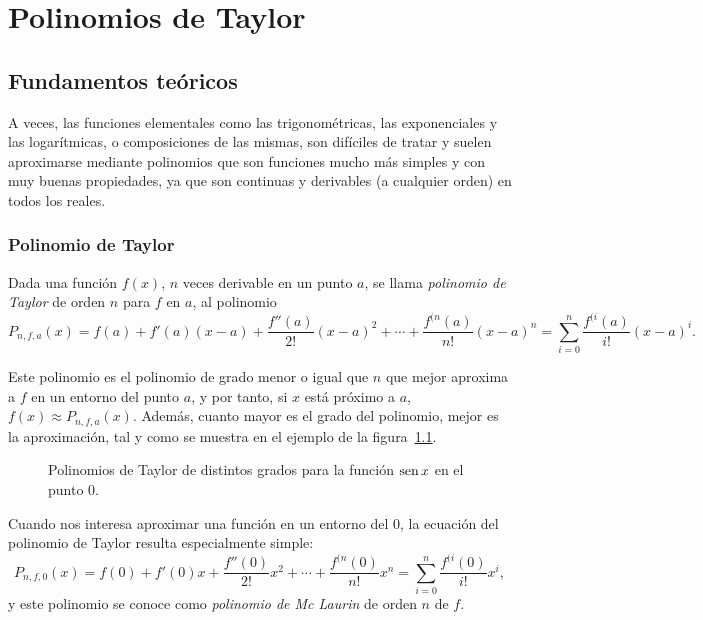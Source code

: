 
\chapter{Polinomios de Taylor}

\section{Fundamentos teóricos}

A veces, las funciones elementales como las trigonométricas, las exponenciales y las logarítmicas, o composiciones de las mismas, son difíciles de tratar y suelen aproximarse mediante polinomios que son funciones mucho más simples y con muy buenas propiedades, ya que son continuas y derivables (a cualquier orden) en todos los reales.

\subsection{Polinomio de Taylor}
Dada una función $f(x)$, $n$ veces derivable en un punto $a$, se llama \emph{polinomio de Taylor} de orden $n$ para $f$ en $a$, al polinomio
\[
P_{n,f,a}(x)=f(a)+f'(a)(x-a)+\frac{f''(a)}{2!}(x-a)^2+\cdots+\frac{f^{(n}(a)}{n!}(x-a)^n= \sum_{i=0}^{n}\frac{f^{(i}(a)}{i!}(x-a)^i.
\]

Este polinomio es el polinomio de grado menor o igual que $n$ que mejor aproxima a $f$ en un entorno del punto $a$, y por tanto, si $x$ está próximo a $a$, $f(x)\approx P_{n,f,a}(x)$. Además, cuanto mayor es el grado del polinomio, mejor es la aproximación, tal y como se muestra en el ejemplo de la figura~\ref{g:polinomios}.
\begin{figure}[h!]
\begin{center}
\scalebox{1}{}
\caption{Polinomios de Taylor de distintos grados para la función $\mathop{\rm sen}\nolimits x$ en el punto 0.}
\label{g:polinomios}
\end{center}
\end{figure}

Cuando nos interesa aproximar una función en un entorno del 0, la ecuación del polinomio de Taylor resulta especialmente simple:
\[
P_{n,f,0}(x)=f(0)+f'(0)x+\frac{f''(0)}{2!}x^2+\cdots+\frac{f^{(n}(0)}{n!}x^n= \sum_{i=0}^{n}\frac{f^{(i}(0)}{i!}x^i,
\]
y este polinomio se conoce como \emph{polinomio de Mc Laurin} de orden $n$ de $f$.

